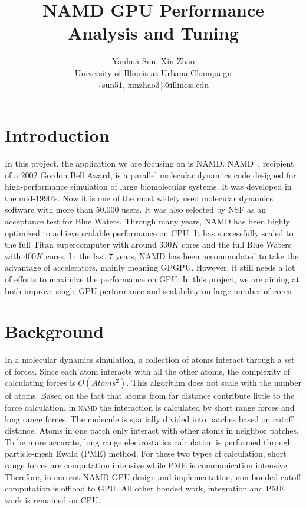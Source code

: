 \documentclass[11pt,onecolumn]{article}
\newcommand{\namd}{\textsc{namd}}
\begin{document}

\title{ NAMD GPU Performance Analysis and Tuning}

\author{
  Yanhua Sun, Xin Zhao\\
  University of Illinois at Urbana-Champaign\\
  \{sun51, xinzhao3\}@illinois.edu
}

\date{}
\maketitle

\lstset{
  basicstyle=\ttfamily,
  showstringspaces=false
}

%
%

\section{Introduction}
In this project, the application we are focusing on is NAMD.
NAMD~\cite{NamdSC02}, recipient of a 2002 Gordon Bell Award, is a parallel molecular 
dynamics code designed for high-performance simulation of large biomolecular systems.
It was developed in the mid-1990's. Now it is one of the most widely used molecular dynamics 
software with more than 50,000 users. It was also selected by NSF as an acceptance test
for Blue Waters.
Through many years, NAMD has been highly optimized to achieve scalable performance on CPU.
It has successfully scaled to the full Titan supercomputer with around $300K$ cores and 
the full Blue Waters with $400K$ cores. In the last 7 years, NAMD has been accommodated
to take the advantage of accelerators, mainly meaning GPGPU. However, it still needs a lot of 
efforts to maximize the performance on GPU. In this project, we are aiming at both 
improve single GPU performance  and scalability on large number of cores. 

\section{Background}
In a molecular dynamics simulation, a collection of atoms interact through a set of forces. 
Since each atom interacts with all the other atoms, the complexity of calculating forces
is $O(Atoms^2)$. This algorithm does not scale with the number of atoms. Based on the fact that
atoms from far distance contribute little to the force calculation, in \namd{} the interaction is
calculated by short range forces and long range forces. The molecule  is spatially divided into 
patches based on cutoff distance. Atoms in one patch only interact with other atoms in neighbor patches.
To be more accurate, long range electrostatics calculation is performed through particle-mesh Ewald (PME) method.
For these two types of calculation, short range forces are computation intensive while PME is communication intensive.
Therefore, in current NAMD GPU design and implementation, non-bonded cutoff computation is offload to GPU.
All other bonded work, integration and PME work is remained on CPU.
\end{document}

